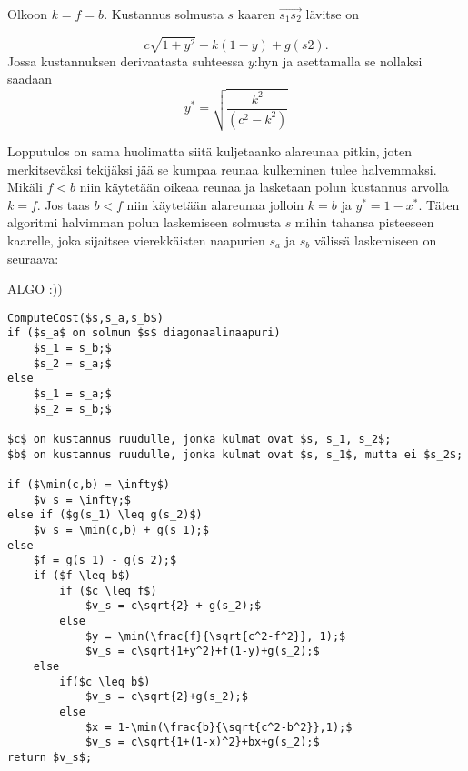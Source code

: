 \documentclass[finnish]{tktltiki2}
\theoremstyle{definition}
\theoremstyle{remark}
\begin{document}
Olkoon $k = f = b$. Kustannus solmusta $s$ kaaren $\overrightarrow{s_1s_2}$ lävitse on

\[c\sqrt{1+y^2}+k(1-y)+g(s2).\]
Jossa kustannuksen derivaatasta suhteessa \(y\):hyn ja asettamalla se nollaksi saadaan
\[y^* = \sqrt{\frac{k^2}{(c^2-k^2)}}\]

Lopputulos on sama huolimatta siitä kuljetaanko alareunaa pitkin, joten merkitseväksi tekijäksi jää se kumpaa reunaa kulkeminen tulee halvemmaksi. Mikäli \(f < b\) niin käytetään oikeaa reunaa ja lasketaan polun kustannus arvolla \(k = f\). Jos taas \(b < f\) niin käytetään alareunaa jolloin \(k = b\) ja \(y^* = 1 - x^*\). Täten algoritmi halvimman polun laskemiseen solmusta \(s\) mihin tahansa pisteeseen kaarelle, joka sijaitsee vierekkäisten naapurien \(s_a\) ja \(s_b\) välissä laskemiseen on seuraava:


ALGO :))
\begin{lstlisting}[mathescape=true]
ComputeCost($s,s_a,s_b$)
if ($s_a$ on solmun $s$ diagonaalinaapuri)
	$s_1 = s_b;$
	$s_2 = s_a;$
else
	$s_1 = s_a;$
	$s_2 = s_b;$

$c$ on kustannus ruudulle, jonka kulmat ovat $s, s_1, s_2$;
$b$ on kustannus ruudulle, jonka kulmat ovat $s, s_1$, mutta ei $s_2$;

if ($\min(c,b) = \infty$)
	$v_s = \infty;$
else if ($g(s_1) \leq g(s_2)$)
	$v_s = \min(c,b) + g(s_1);$
else
	$f = g(s_1) - g(s_2);$
	if ($f \leq b$)
		if ($c \leq f$)
			$v_s = c\sqrt{2} + g(s_2);$
		else
			$y = \min(\frac{f}{\sqrt{c^2-f^2}}, 1);$
			$v_s = c\sqrt{1+y^2}+f(1-y)+g(s_2);$
	else
		if($c \leq b$)
			$v_s = c\sqrt{2}+g(s_2);$
		else
			$x = 1-\min(\frac{b}{\sqrt{c^2-b^2}},1);$
			$v_s = c\sqrt{1+(1-x)^2}+bx+g(s_2);$
return $v_s$;

\end{lstlisting}
%
%
% 
%







% 
\end{document}
